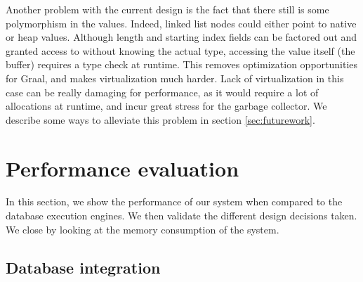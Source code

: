 \documentclass[twoside,11pt,a4paper]{article}
\newcommand{\startsection}[1]{
	\cleardoublepage
	\section{#1}
	\thispagestyle{basic}
}
\begin{document}
Another problem with the current design is the fact that there still is some polymorphism in the values. Indeed, linked list nodes could either point to native or heap values. Although length and starting index fields can be factored out and granted access to without knowing the actual type, accessing the value itself (the buffer) requires a type check at runtime. This removes optimization opportunities for Graal, and makes virtualization much harder. Lack of virtualization in this case can be really damaging for performance, as it would require a lot of allocations at runtime, and incur great stress for the garbage collector. We describe some ways to alleviate this problem in section \ref{sec:futurework}.

\startsection{Performance evaluation}
\label{sec:benchmarks}

In this section, we show the performance of our system when compared to the database execution engines. We then validate the different design decisions taken. We close by looking at the memory consumption of the system.


\subsection{Database integration}

\end{document}
